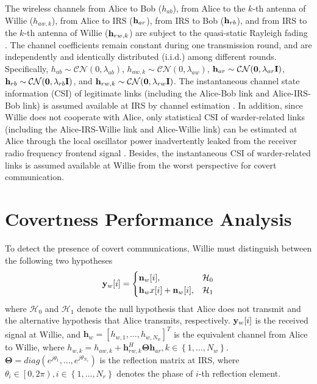 \documentclass[conference]{IEEEtran}
\begin{document}
The wireless channels from Alice to Bob ($h_{ab}$), from Alice to the $k$-th antenna of Willie (${{h}}_{aw,k}$), from Alice to IRS (${\bf{h}}_{ar}$), from IRS to Bob (${\bf{h}}_{rb}$), and from IRS to the $k$-th antenna of Willie (${\bf{h}}_{rw,k}$) are subject to the quasi-static Rayleigh fading \cite{IRS1}. The channel coefficients remain constant during one transmission round, and are independently and identically distributed (i.i.d.) among different rounds. Specifically, $h_{ab} \sim \mathcal{CN}(0,\lambda_{ab})$, $h_{aw,k} \sim \mathcal{CN}(0,\lambda_{aw})$, ${\bf{h}}_{ar} \sim \mathcal{CN}({\bf{0}},\lambda_{ar}{\bf{I}})$, ${\bf{h}}_{rb} \sim \mathcal{CN}({\bf{0}},\lambda_{rb}{\bf{I}})$, and ${\bf{h}}_{rw,k} \sim \mathcal{CN}({\bf{0}},\lambda_{rw}{{\bf{I}}})$. The instantaneous channel state information (CSI) of legitimate links (including the Alice-Bob link and Alice-IRS-Bob link) is assumed available at IRS by channel estimation \cite{channel_estimation}. In addition, since Willie does not cooperate with Alice, only statistical CSI of warder-related links (including the Alice-IRS-Willie link and Alice-Willie link) can be estimated at Alice through the local oscillator power inadvertently leaked from the receiver radio frequency frontend signal \cite{Willie_CSI3}. Besides, the instantaneous CSI of warder-related links is assumed available at Willie from the worst perspective for covert communication.

\section{Covertness Performance Analysis}
To detect the presence of covert communications, Willie must distinguish between the following two hypotheses
\begin{equation}
	{\bf{y}}_w[i]= \begin{cases} {\bf{n}}_w[i], & \mathcal{H}_0 \\ {\bf{h}}_w x[i]+{\bf{n}}_w[i], & \mathcal{H}_1\end{cases}
\end{equation}
where $\mathcal{H}_0$ and $\mathcal{H}_1$ denote the null hypothesis that Alice does not transmit and the alternative hypothesis that Alice transmits, respectively. ${\bf{y}}_w[i]$ is the received signal at Willie, and ${{\mathbf{h}}_w} = {\left[ {{h_{w,1}}, \ldots ,{h_{w,{N_w}}}} \right]^T}$ is the equivalent channel from Alice to Willie, where ${h_{w,k}} = {h_{aw,k}} + {\mathbf{h}}_{rw,k}^H{\mathbf{\Theta }}{{\mathbf{h}}_{ar}},k \in \left\{ {1, \ldots ,{N_w}} \right\}$. ${\mathbf{\Theta }} = diag\left( {{e^{j{\theta _1}}}, \ldots ,{e^{j{\theta _{{N_r}}}}}} \right)$ is the reflection matrix at IRS, where ${\theta _i} \in \left[ {0,2\pi } \right),i \in \left\{ {1, \ldots ,{N_r}} \right\}$ denotes the phase of $i$-th reflection element.
\end{document}
